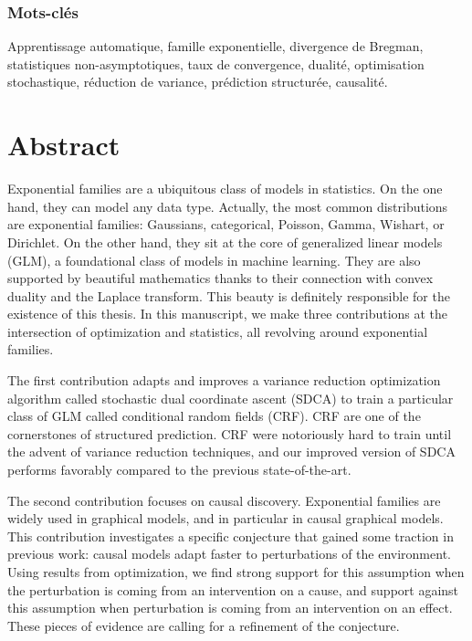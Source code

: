 \documentclass[12pt]{report} %
\numberwithin{equation}{chapter}
\numberwithin{table}{chapter}
\numberwithin{figure}{chapter}
\begin{document}
\subsection*{Mots-clés}
Apprentissage automatique, famille exponentielle, divergence de Bregman, statistiques non-asymptotiques, taux de convergence, dualité, optimisation stochastique, réduction de variance, prédiction structurée, causalité.


\chapter*{Abstract}

Exponential families are a ubiquitous class of models in statistics.
On the one hand, they can model any data type.
Actually, the most common distributions are exponential families: Gaussians, categorical, Poisson, Gamma, Wishart, or Dirichlet.
On the other hand, they sit at the core of generalized linear models (GLM), a foundational class of models in machine learning.
They are also supported by beautiful mathematics thanks to their connection with convex duality and the Laplace transform.
This beauty is definitely responsible for the existence of this thesis.
In this manuscript, we make three contributions at the intersection of optimization and statistics, all revolving around exponential families.

The first contribution adapts and improves a variance reduction optimization algorithm called stochastic dual coordinate ascent (SDCA) to train a particular class of GLM called conditional random fields (CRF). CRF are one of the cornerstones of structured prediction. CRF were notoriously hard to train until the advent of variance reduction techniques, and our improved version of SDCA performs favorably compared to the previous state-of-the-art.

The second contribution focuses on causal discovery.
Exponential families are widely used in graphical models, and in particular in causal graphical models.
This contribution investigates a specific conjecture that gained some traction in previous work: causal models adapt faster to perturbations of the environment.
Using results from optimization, we find strong support for this assumption when the perturbation is coming from an intervention on a cause, and support against this assumption when perturbation is coming from an intervention on an effect.
These pieces of evidence are calling for a refinement of the conjecture.
\end{document}
